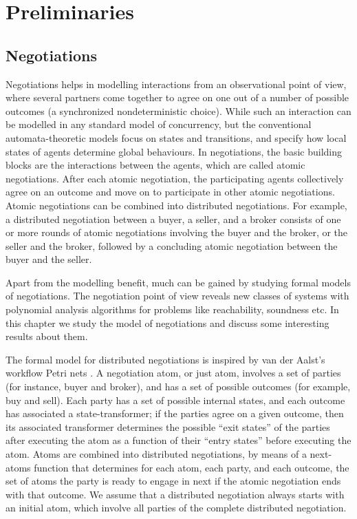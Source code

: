 \chapter{Preliminaries}



\section{Negotiations}

Negotiations helps in modelling interactions from an observational point of view, where several partners come together to agree on one out of a number of possible outcomes (a synchronized nondeterministic choice). While such an interaction can be modelled in any standard model of concurrency, but the conventional automata-theoretic models focus on states and transitions, and specify how local states of agents determine global behaviours. In negotiations, the basic building blocks are the interactions between the agents, which are called atomic negotiations. After each atomic negotiation, the participating agents collectively agree on an outcome and move on to participate in other atomic negotiations. Atomic negotiations can be combined into distributed negotiations. For example, a distributed negotiation between a buyer, a seller, and a broker consists of one or more rounds of atomic negotiations involving the buyer and the broker, or the seller and the broker, followed by a concluding atomic negotiation between the buyer and the seller.

Apart from the modelling benefit, much can be gained by studying formal models of negotiations. The negotiation point of view reveals new classes of systems with polynomial analysis algorithms for problems like reachability, soundness etc. In this chapter we study the model of negotiations and discuss some interesting results about them.

The formal model for distributed negotiations is inspired by van der Aalst’s workflow Petri nets \cite{}. A negotiation atom, or just atom, involves a set of parties (for instance, buyer and broker), and has a set of possible outcomes (for example, buy and sell). Each party has a set of possible internal states, and each outcome has associated a state-transformer; if the parties agree on a given outcome, then its associated transformer determines the possible “exit states” of the parties after executing the atom as a function of their “entry states” before executing the atom. Atoms are combined into distributed negotiations, by means of a next-atoms function that determines for each atom, each party, and each outcome, the set of atoms the party is ready to engage in next if the atomic negotiation ends with that outcome. We assume that a distributed negotiation always starts with an initial atom, which involve all parties of the complete distributed negotiation.


